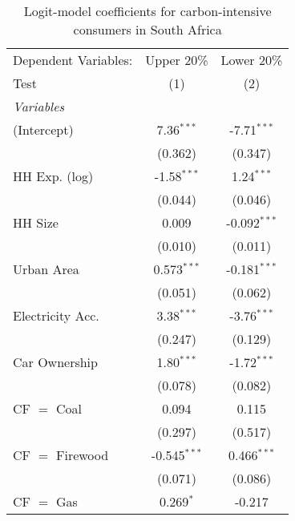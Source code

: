 
\begin{table}[htbp!]
   \centering
   \small
   \begin{adjustbox}{width = 1\textwidth, max height = 0.95\textheight, center}
      \begin{threeparttable}[b]
         \caption{\label{tab:Logit_1_ZAF} Logit-model coefficients for carbon-intensive consumers in South Africa}
         \begin{tabular}{lcc}
            \tabularnewline \midrule \midrule
            Dependent Variables: & Upper 20\%     & Lower 20\%\\   
            Test                 & (1)            & (2)\\  
            \midrule
            \emph{Variables}\\
            (Intercept)          & 7.36$^{***}$   & -7.71$^{***}$\\   
                                 & (0.362)        & (0.347)\\   
            HH Exp. (log)        & -1.58$^{***}$  & 1.24$^{***}$\\   
                                 & (0.044)        & (0.046)\\   
            HH Size              & 0.009          & -0.092$^{***}$\\   
                                 & (0.010)        & (0.011)\\   
            Urban Area           & 0.573$^{***}$  & -0.181$^{***}$\\   
                                 & (0.051)        & (0.062)\\   
            Electricity Acc.     & 3.38$^{***}$   & -3.76$^{***}$\\   
                                 & (0.247)        & (0.129)\\   
            Car Ownership        & 1.80$^{***}$   & -1.72$^{***}$\\   
                                 & (0.078)        & (0.082)\\   
            CF $=$ Coal          & 0.094          & 0.115\\   
                                 & (0.297)        & (0.517)\\   
            CF $=$ Firewood      & -0.545$^{***}$ & 0.466$^{***}$\\   
                                 & (0.071)        & (0.086)\\   
            CF $=$ Gas           & 0.269$^{*}$    & -0.217\\   

\end{tabular}
\end{threeparttable}
\end{adjustbox}
\end{table}
